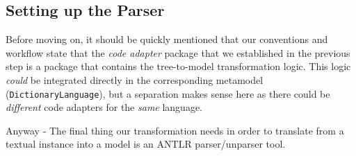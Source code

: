 \newpage
\hypertarget{subSec:setupParser}{}
\subsection{Setting up the Parser}
\genHeader

Before moving on, it should be quickly mentioned that our conventions and workflow state that the \emph{code adapter} package that we established in the
previous step is a package that contains the tree-to-model transformation logic. This logic \emph{could} be integrated directly in the corresponding metamodel
(\texttt{Dic\-tion\-ary\-Language}), but a separation makes sense here as there could be \emph{different} code adapters for the \emph{same} language.

Anyway - The final thing our transformation needs in order to translate from a textual instance into a model is an ANTLR parser/unparser tool.

